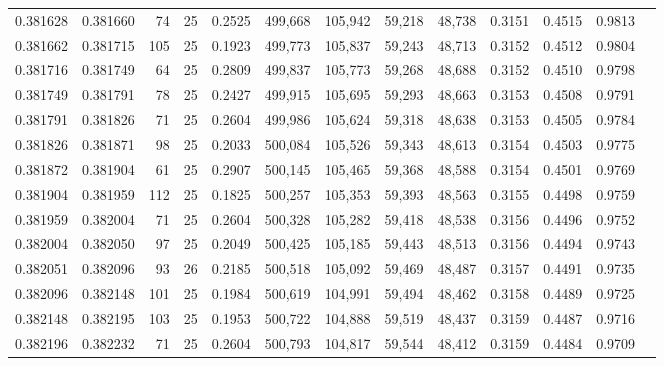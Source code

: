 \begin{tabular}{rrrrrrrrrrrrr}
0.381628 & 0.381660 &    74 &  25 &                                     0.2525 & 499,668 & 105,942 &  59,218 &  48,738 & 0.3151 & 0.4515 & 0.9813 \\
0.381662 & 0.381715 &   105 &  25 &                                     0.1923 & 499,773 & 105,837 &  59,243 &  48,713 & 0.3152 & 0.4512 & 0.9804 \\
0.381716 & 0.381749 &    64 &  25 &                                     0.2809 & 499,837 & 105,773 &  59,268 &  48,688 & 0.3152 & 0.4510 & 0.9798 \\
0.381749 & 0.381791 &    78 &  25 &                                     0.2427 & 499,915 & 105,695 &  59,293 &  48,663 & 0.3153 & 0.4508 & 0.9791 \\
0.381791 & 0.381826 &    71 &  25 &                                     0.2604 & 499,986 & 105,624 &  59,318 &  48,638 & 0.3153 & 0.4505 & 0.9784 \\
0.381826 & 0.381871 &    98 &  25 &                                     0.2033 & 500,084 & 105,526 &  59,343 &  48,613 & 0.3154 & 0.4503 & 0.9775 \\
0.381872 & 0.381904 &    61 &  25 &                                     0.2907 & 500,145 & 105,465 &  59,368 &  48,588 & 0.3154 & 0.4501 & 0.9769 \\
0.381904 & 0.381959 &   112 &  25 &                                     0.1825 & 500,257 & 105,353 &  59,393 &  48,563 & 0.3155 & 0.4498 & 0.9759 \\
0.381959 & 0.382004 &    71 &  25 &                                     0.2604 & 500,328 & 105,282 &  59,418 &  48,538 & 0.3156 & 0.4496 & 0.9752 \\
0.382004 & 0.382050 &    97 &  25 &                                     0.2049 & 500,425 & 105,185 &  59,443 &  48,513 & 0.3156 & 0.4494 & 0.9743 \\
0.382051 & 0.382096 &    93 &  26 &                                     0.2185 & 500,518 & 105,092 &  59,469 &  48,487 & 0.3157 & 0.4491 & 0.9735 \\
0.382096 & 0.382148 &   101 &  25 &                                     0.1984 & 500,619 & 104,991 &  59,494 &  48,462 & 0.3158 & 0.4489 & 0.9725 \\
0.382148 & 0.382195 &   103 &  25 &                                     0.1953 & 500,722 & 104,888 &  59,519 &  48,437 & 0.3159 & 0.4487 & 0.9716 \\
0.382196 & 0.382232 &    71 &  25 &                                     0.2604 & 500,793 & 104,817 &  59,544 &  48,412 & 0.3159 & 0.4484 & 0.9709 \\

\end{tabular}
